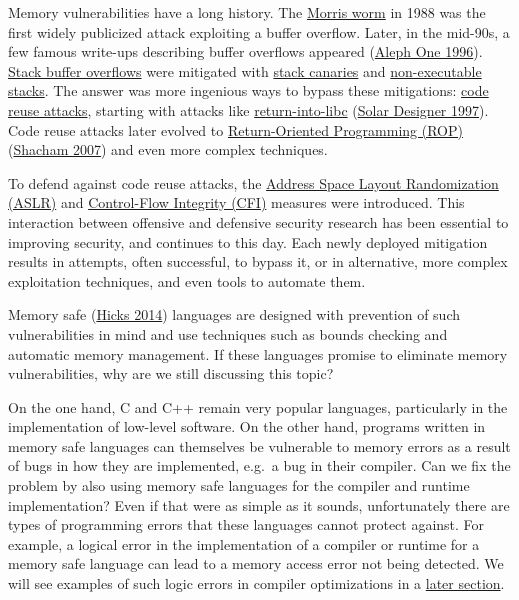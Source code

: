 \documentclass[
  a4paper,
]{report}
\begin{document}
Memory vulnerabilities have a long history. The
\href{https://en.wikipedia.org/wiki/Morris_worm}{Morris worm} in 1988
was the first widely publicized attack exploiting a buffer overflow.
Later, in the mid-90s, a few famous write-ups describing buffer
overflows appeared (\protect\hyperlink{ref-AlephOne1996}{Aleph One
1996}). \protect\hyperlink{stack-buffer-overflows}{Stack buffer
overflows} were mitigated with
\protect\hyperlink{stack-buffer-overflows}{stack canaries} and
\protect\hyperlink{stack-buffer-overflows}{non-executable stacks}. The
answer was more ingenious ways to bypass these mitigations:
\protect\hyperlink{code-reuse-attacks}{code reuse attacks}, starting
with attacks like
\protect\hyperlink{code-reuse-attacks}{return-into-libc}
(\protect\hyperlink{ref-Solar1997}{Solar Designer 1997}). Code reuse
attacks later evolved to
\protect\hyperlink{return-oriented-programming}{Return-Oriented
Programming (ROP)} (\protect\hyperlink{ref-Shacham2007}{Shacham 2007})
and even more complex techniques.

To defend against code reuse attacks, the
\protect\hyperlink{aslr}{Address Space Layout Randomization (ASLR)} and
\protect\hyperlink{cfi}{Control-Flow Integrity (CFI)} measures were
introduced. This interaction between offensive and defensive security
research has been essential to improving security, and continues to this
day. Each newly deployed mitigation results in attempts, often
successful, to bypass it, or in alternative, more complex exploitation
techniques, and even tools to automate them.

Memory safe (\protect\hyperlink{ref-Hicks2014}{Hicks 2014}) languages
are designed with prevention of such vulnerabilities in mind and use
techniques such as bounds checking and automatic memory management. If
these languages promise to eliminate memory vulnerabilities, why are we
still discussing this topic?

On the one hand, C and C++  remain very popular
languages, particularly in the implementation of low-level software. On
the other hand, programs written in memory safe languages can themselves
be vulnerable to memory errors as a result of bugs in how they are
implemented, e.g.~a bug in their compiler. Can we fix the problem by
also using memory safe languages for the compiler and runtime
implementation? Even if that were as simple as it sounds, unfortunately
there are types of programming errors that these languages cannot
protect against. For example, a logical error in the implementation of a
compiler or runtime for a memory safe language can lead to a memory
access error not being detected. We will see examples of such logic
errors in compiler optimizations in a
\protect\hyperlink{jit-compiler-vulnerabilities}{later section}.
\end{document}
